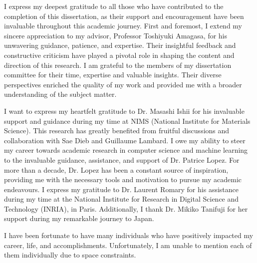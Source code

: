 I express my deepest gratitude to all those who have contributed to the completion of this dissertation, as their support and encouragement have been invaluable throughout this academic journey.
First and foremost, I extend my sincere appreciation to my advisor, Professor Toshiyuki Amagasa, for his unwavering guidance, patience, and expertise. Their insightful feedback and constructive criticism have played a pivotal role in shaping the content and direction of this research.
I am grateful to the members of my dissertation committee for their time, expertise and valuable insights. Their diverse perspectives enriched the quality of my work and provided me with a broader understanding of the subject matter.

I want to express my heartfelt gratitude to Dr. Masashi Ishii for his invaluable support and guidance during my time at NIMS (National Institute for Materials Science).
This research has greatly benefited from fruitful discussions and collaboration with Sae Dieb and Guillaume Lambard. 
I owe my ability to steer my career towards academic research in computer science and machine learning to the invaluable guidance, assistance, and support of Dr. Patrice Lopez. For more than a decade, Dr. Lopez has been a constant source of inspiration, providing me with the necessary tools and motivation to pursue my academic endeavours.
I express my gratitude to Dr. Laurent Romary for his assistance during my time at the National Institute for Research in Digital Science and Technology (INRIA), in Paris. Additionally, I thank Dr. Mikiko Tanifuji for her support during my remarkable journey to Japan. 

I have been fortunate to have many individuals who have positively impacted my career, life, and accomplishments. Unfortunately, I am unable to mention each of them individually due to space constraints.